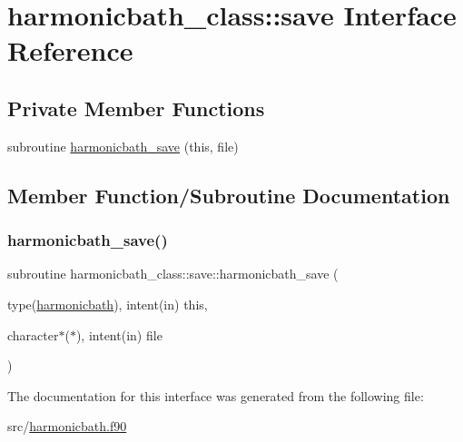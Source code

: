 \hypertarget{interfaceharmonicbath__class_1_1save}{}\section{harmonicbath\+\_\+class\+:\+:save Interface Reference}
\label{interfaceharmonicbath__class_1_1save}
\subsection*{Private Member Functions}
\begin{DoxyCompactItemize}
\item 
subroutine \hyperlink{interfaceharmonicbath__class_1_1save_a1a3f85e1476d58e6480f57e927e02caa}{harmonicbath\+\_\+save} (this, file)
\end{DoxyCompactItemize}


\subsection{Member Function/\+Subroutine Documentation}
\mbox{\label{interfaceharmonicbath__class_1_1save_a1a3f85e1476d58e6480f57e927e02caa}} 
\subsubsection{\texorpdfstring{harmonicbath\+\_\+save()}{harmonicbath\_save()}}
{\footnotesize\ttfamily subroutine harmonicbath\+\_\+class\+::save\+::harmonicbath\+\_\+save (\begin{DoxyParamCaption}\item[{type(\hyperlink{structharmonicbath__class_1_1harmonicbath}{harmonicbath}), intent(in)}]{this,  }\item[{character$\ast$($\ast$), intent(in)}]{file }\end{DoxyParamCaption})\hspace{0.3cm}{\ttfamily [private]}}



The documentation for this interface was generated from the following file\+:\begin{DoxyCompactItemize}
\item 
src/\hyperlink{harmonicbath_8f90}{harmonicbath.\+f90}\end{DoxyCompactItemize}
